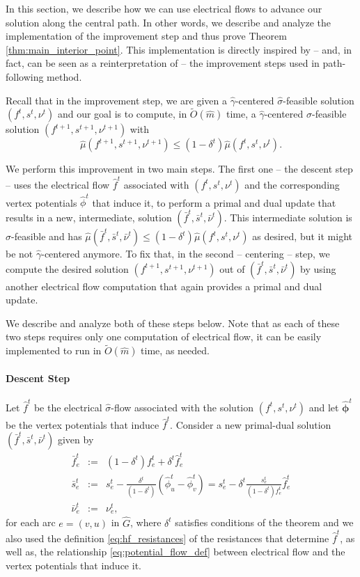 \documentclass[11pt, letterpaper]{article}
\newcommand{\tO}[1]{\widetilde{O}(#1)}
\newcommand{\hG}{\widehat{G}}
\newcommand{\hm}{\widehat{m}}
\newcommand{\hf}{\hat{f}}
\newcommand{\of}{\bar{f}}
\newcommand{\os}{\bar{s}}
\newcommand{\onu}{\bar{\nu}}
\newcommand{\hmu}{\hat{\mu}}
\newcommand{\hgamma}{\hat{\gamma}}
\newcommand{\vnu}{\boldsymbol{\mathit{\nu}}}
\newcommand{\ovnu}{\boldsymbol{\bar{\mathit{\nu}}}}
\newcommand{\hvsigma}{\boldsymbol{\mathit{\hat{\sigma}}}}
\newcommand{\hphi}{\widehat{\phi}}
\newcommand{\hvphi}{\boldsymbol{\widehat{\phi}}}
\newcommand{\ff}{\boldsymbol{\mathit{f}}}
\newcommand{\off}{\boldsymbol{\mathit{\bar{f}}}}
\newcommand{\hff}{\boldsymbol{\mathit{\hat{f}}}}
\renewcommand{\ss}{\boldsymbol{\mathit{s}}}
\newcommand{\oss}{\boldsymbol{\bar{\mathit{s}}}}
\begin{document}
In this section, we describe how we can use electrical flows to advance our solution along the central path. In other words, we describe and analyze the implementation of the improvement step and thus prove Theorem \ref{thm:main_interior_point}. This implementation is directly inspired by -- and, in fact, can be seen as a reinterpretation of -- the improvement steps used in path-following method. 

Recall that in the improvement step, we are given a $\hgamma$-centered $\hvsigma$-feasible solution $(\ff^t,\ss^t,\vnu^t)$ and our goal is to compute, in $\tO{\hm}$ time, a $\hgamma$-centered $\hvsigma$-feasible solution $(\ff^{t+1},\ss^{t+1},\vnu^{t+1})$ with 
\begin{equation}
\label{eq:inter_progress}
\hmu(\ff^{t+1},\ss^{t+1},\vnu^{t+1})\leq (1-\delta^t) \hmu(\ff^t,\ss^t,\vnu^t).
\end{equation}

We perform this improvement in two main steps. The first one -- the descent step -- uses the electrical flow $\hff^t$ associated with  $(\ff^{t},\ss^{t},\vnu^{t})$ and the corresponding vertex potentials $\hphi^t$ that induce it, to perform a primal and dual update that results in a new, intermediate, solution $(\off^t,\oss^t,\ovnu^t)$. This intermediate solution is $\hvsigma$-feasible and has $\hmu(\off^t,\oss^t,\ovnu^t)\leq (1-\delta^t)\hmu(\ff^{t},\ss^{t},\vnu^{t})$ as desired, but it might be not $\hgamma$-centered anymore. To fix that, in the second -- centering -- step, we compute the desired solution $(\ff^{t+1},\ss^{t+1},\vnu^{t+1})$ out of $(\off^t,\oss^t,\ovnu^t)$ by using another electrical flow computation that again provides a primal and dual update.

 We describe and analyze both of these steps below. Note that as each of these two steps requires only one computation of electrical flow, it can be easily implemented to run in $\tO{\hm}$ time, as needed.

\paragraph{Descent Step}

Let $\hff^t$ be the electrical $\hvsigma$-flow associated with the solution $(\ff^{t},\ss^{t},\vnu^{t})$ and let $\hvphi^t$ be the vertex potentials that induce $\hff^t$. Consider a new primal-dual solution $(\off^t,\oss^t,\ovnu^t)$ given by
\begin{eqnarray}
\of_e^t & := & (1-\delta^t) f_e^t + \delta^t \hf_e^t\\
\os_e^t & := & s_e^t - \frac{\delta^t}{(1-\delta^t)} (\hphi^t_u-\hphi^t_v)=s_e^t - \delta^t \frac{s_e^t}{(1-\delta^t)f_e^t} \hf_e^t\\
\onu_e^t& := & \nu^t_e,
\end{eqnarray}
for each arc $e=(v,u)$ in $\hG$, where $\delta^t$ satisfies conditions of the theorem and we also used the definition \eqref{eq:hf_resistances} of the resistances that determine $\hff^t$, as well as, the relationship \eqref{eq:potential_flow_def} between electrical flow and the vertex potentials that induce it. 
\end{document}

